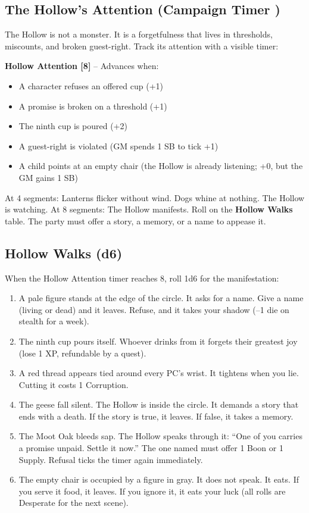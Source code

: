 \subsection*{The Hollow's Attention (Campaign Timer )}
The Hollow is not a monster. It is a forgetfulness that lives in thresholds, miscounts, and broken guest-right. Track its attention with a visible timer:

\textbf{Hollow Attention [8]} -- Advances when:
\begin{itemize}
\item A character refuses an offered cup (+1)
\item A promise is broken on a threshold (+1)
\item The ninth cup is poured (+2)
\item A guest-right is violated (GM spends 1 SB to tick +1)
\item A child points at an empty chair (the Hollow is already listening; +0, but the GM gains 1 SB)
\end{itemize}
At 4 segments: Lanterns flicker without wind. Dogs whine at nothing. The Hollow is watching.  
At 8 segments: The Hollow manifests. Roll on the \textbf{Hollow Walks} table. The party must offer a story, a memory, or a name to appease it.

\subsection*{Hollow Walks (d6)}
When the Hollow Attention timer reaches 8, roll 1d6 for the manifestation:
\begin{enumerate}
\item A pale figure stands at the edge of the circle. It asks for a name. Give a name (living or dead) and it leaves. Refuse, and it takes your shadow (--1 die on stealth for a week).
\item The ninth cup pours itself. Whoever drinks from it forgets their greatest joy (lose 1 XP, refundable by a quest).
\item A red thread appears tied around every PC's wrist. It tightens when you lie. Cutting it costs 1 Corruption.
\item The geese fall silent. The Hollow is inside the circle. It demands a story that ends with a death. If the story is true, it leaves. If false, it takes a memory.
\item The Moot Oak bleeds sap. The Hollow speaks through it: ``One of you carries a promise unpaid. Settle it now.'' The one named must offer 1 Boon or 1 Supply. Refusal ticks the timer again immediately.
\item The empty chair is occupied by a figure in gray. It does not speak. It eats. If you serve it food, it leaves. If you ignore it, it eats your luck (all rolls are Desperate for the next scene).
\end{enumerate}

